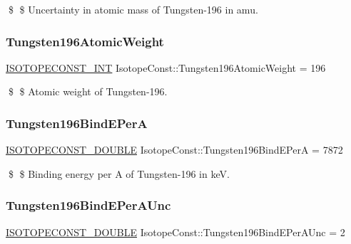 \$ \$ Uncertainty in atomic mass of Tungsten-\/196 in amu. \mbox{\label{group___isotope_const-_tungsten-_w196_gacd93d5aef6bbcc28ec183fdf4d5f6525}} 
\subsubsection{\texorpdfstring{Tungsten196\+Atomic\+Weight}{Tungsten196AtomicWeight}}
{\footnotesize\ttfamily \mbox{\hyperlink{group___isotope_const-_macros_ga5f18360b3e99483a35c32d789e62621c}{I\+S\+O\+T\+O\+P\+E\+C\+O\+N\+S\+T\+\_\+\+I\+NT}} Isotope\+Const\+::\+Tungsten196\+Atomic\+Weight = 196}

\$ \$ Atomic weight of Tungsten-\/196. \mbox{\label{group___isotope_const-_tungsten-_w196_gada98f4fd24dca69a6ecb6b9e6402e609}} 
\subsubsection{\texorpdfstring{Tungsten196\+Bind\+E\+PerA}{Tungsten196BindEPerA}}
{\footnotesize\ttfamily \mbox{\hyperlink{group___isotope_const-_macros_ga8f45a7272ce02c0b4c65c44636ed719a}{I\+S\+O\+T\+O\+P\+E\+C\+O\+N\+S\+T\+\_\+\+D\+O\+U\+B\+LE}} Isotope\+Const\+::\+Tungsten196\+Bind\+E\+PerA = 7872}

\$ \$ Binding energy per A of Tungsten-\/196 in keV. \mbox{\label{group___isotope_const-_tungsten-_w196_ga850a5f7edfe1494b5cd6b4a23cff60f4}} 
\subsubsection{\texorpdfstring{Tungsten196\+Bind\+E\+Per\+A\+Unc}{Tungsten196BindEPerAUnc}}
{\footnotesize\ttfamily \mbox{\hyperlink{group___isotope_const-_macros_ga8f45a7272ce02c0b4c65c44636ed719a}{I\+S\+O\+T\+O\+P\+E\+C\+O\+N\+S\+T\+\_\+\+D\+O\+U\+B\+LE}} Isotope\+Const\+::\+Tungsten196\+Bind\+E\+Per\+A\+Unc = 2}


